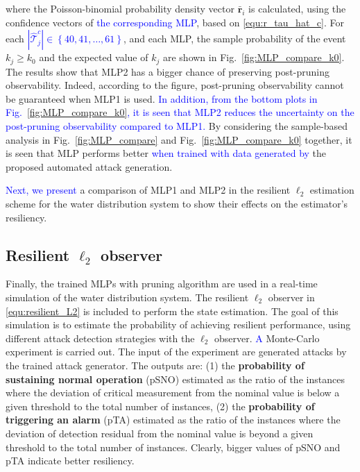 where the Poisson-binomial probability density vector $\bar{\mathbf{r}}_i$ is calculated, using the confidence vectors of \textcolor{blue}{the corresponding MLP}, based on \eqref{equ:r_tau_hat_c}. For each \textcolor{blue}{$|\hat{\mathcal{T}}_j^c| \in \left\{40,41,\hdots,61\right\}$}, and each MLP, the sample probability of the event $k_j\ge k_0$ and the expected value of $k_j$ are shown in Fig.~\ref{fig:MLP_compare_k0}. The results show that  MLP2 has a bigger chance of preserving post-pruning observability. Indeed, according to the figure, post-pruning observability cannot be guaranteed when MLP1 is used. \textcolor{blue}{In addition, from the bottom plots in Fig.~\ref{fig:MLP_compare_k0}, it is seen that MLP2 reduces the uncertainty on the post-pruning observability compared to MLP1.} By considering the sample-based analysis in Fig.~\ref{fig:MLP_compare} and Fig.~\ref{fig:MLP_compare_k0} together, it is seen that MLP performs better \textcolor{blue}{when trained with data generated by} the proposed automated attack generation.

\textcolor{blue}{Next, we present} a comparison of MLP1 and MLP2 in the resilient $\ell_2$ estimation scheme for the water distribution system to show their effects on the estimator's resiliency.

\subsection{Resilient $\ell_2$ observer}
Finally, the trained MLPs with pruning algorithm are used in a real-time simulation of the water distribution system. The resilient $\ell_2$ observer in \eqref{equ:resilient_L2} is included to perform the state estimation. The goal of this simulation is to estimate the probability of achieving resilient performance, using different attack detection strategies with the $\ell_2$ observer. \textcolor{blue}{A} Monte-Carlo experiment is carried out. The input of the experiment are generated attacks by the trained attack generator. The outputs are: (1) the \textbf{probability of sustaining normal operation} (pSNO) estimated as the ratio of the instances where the deviation of critical measurement from the nominal value is below a given threshold to the total number of instances, (2) the \textbf{probability of triggering an alarm} (pTA) estimated as the ratio of the instances where the deviation of detection residual from the nominal value is beyond a given threshold to the total number of instances. Clearly, bigger values of pSNO and pTA indicate better resiliency.

